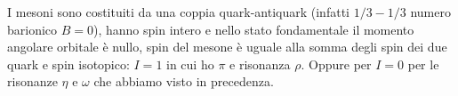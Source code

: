 I mesoni sono costituiti da una coppia quark-antiquark (infatti $1/3-1/3$ numero barionico $B=0$), hanno spin intero e nello stato fondamentale il momento angolare orbitale è nullo, spin del mesone è uguale alla somma degli spin dei due quark e spin isotopico: $I=1$ in cui ho $\pi$ e risonanza $\rho$. Oppure per $I=0$ per le risonanze $\eta$ e $\omega$ che abbiamo visto in precedenza. 